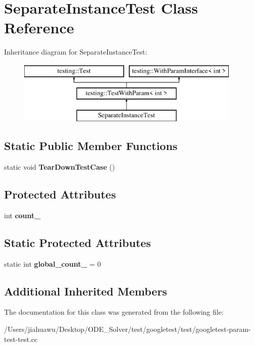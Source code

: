 \hypertarget{class_separate_instance_test}{}\section{Separate\+Instance\+Test Class Reference}
\label{class_separate_instance_test}
Inheritance diagram for Separate\+Instance\+Test\+:\begin{figure}[H]
\begin{center}
\leavevmode
\includegraphics[height=3.000000cm]{class_separate_instance_test}
\end{center}
\end{figure}
\subsection*{Static Public Member Functions}
\begin{DoxyCompactItemize}
\item 
\mbox{\label{class_separate_instance_test_a7c4a72843a7c4a9be56adef27ecd33c7}} 
static void {\bfseries Tear\+Down\+Test\+Case} ()
\end{DoxyCompactItemize}
\subsection*{Protected Attributes}
\begin{DoxyCompactItemize}
\item 
\mbox{\label{class_separate_instance_test_a04af1b3b711671ecb0778af1330a740f}} 
int {\bfseries count\+\_\+}
\end{DoxyCompactItemize}
\subsection*{Static Protected Attributes}
\begin{DoxyCompactItemize}
\item 
\mbox{\label{class_separate_instance_test_a79db6d4cdd6c99b256439cc020f782ef}} 
static int {\bfseries global\+\_\+count\+\_\+} = 0
\end{DoxyCompactItemize}
\subsection*{Additional Inherited Members}


The documentation for this class was generated from the following file\+:\begin{DoxyCompactItemize}
\item 
/\+Users/jiahuawu/\+Desktop/\+O\+D\+E\+\_\+\+Solver/test/googletest/test/googletest-\/param-\/test-\/test.\+cc\end{DoxyCompactItemize}
